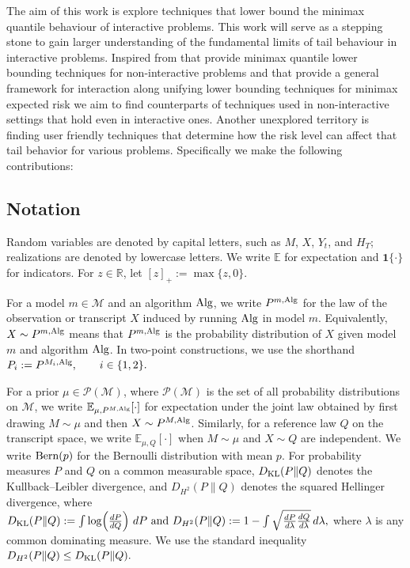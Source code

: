 \documentclass[conference]{IEEEtran}
\begin{document}
The aim of this work is explore techniques that lower bound the minimax quantile behaviour of interactive problems. This work will serve as a stepping stone to gain larger understanding of the fundamental limits of tail behaviour in interactive problems. Inspired from \cite{ma2024high} that provide minimax quantile lower bounding techniques for non-interactive problems and \cite{chen2024assouad} that provide a general framework for interaction along unifying lower bounding techniques for minimax expected risk we aim to find counterparts of techniques used in non-interactive settings that hold even in interactive ones. Another unexplored territory is finding user friendly techniques that determine how the risk level can affect that tail behavior for various problems. Specifically we make the following contributions: 


\fi

\subsection{Notation}

Random variables are denoted by capital letters, such as \(M\), \(X\), \(Y_t\), and \(H_T\); realizations are denoted by lowercase letters. We write \(\mathbb{E}\) for expectation and \(\mathbf{1}\{\cdot\}\) for indicators. For \(z\in\mathbb{R}\), let
\(
[z]_+ := \max\{z,0\}.
\)

For a model \(m\in\mathcal M\) and an algorithm \(\textup{Alg}\), we write
\(
P^{m,\textup{Alg}}
\)
for the law of the observation or transcript \(X\) induced by running \(\textup{Alg}\) in model \(m\). Equivalently,
\(
X\sim P^{m,\textup{Alg}}
\)
means that \(P^{m,\textup{Alg}}\) is the probability distribution of \(X\) given model \(m\) and algorithm \(\textup{Alg}\). In two-point constructions, we use the shorthand
\(
P_i:=P^{M_i,\textup{Alg}}, \qquad i\in\{1,2\}.
\)

For a prior \(\mu\in\mathcal{P}(\mathcal M)\), where \(\mathcal{P}(\mathcal M)\) is the set of all probability distributions on \(\mathcal M\), we write
\(
\mathbb{E}_{\mu,P^{M,\textup{Alg}}}[\cdot]
\)
for expectation under the joint law obtained by first drawing \(M\sim\mu\) and then \(X\sim P^{M,\textup{Alg}}\). Similarly, for a reference law \(Q\) on the transcript space, we write
\(
\mathbb{E}_{\mu,Q}[\cdot]
\)
when \(M\sim\mu\) and \(X\sim Q\) are independent. 
We write \(\textup{Bern}(p)\) for the Bernoulli distribution with mean \(p\). For probability measures \(P\) and \(Q\) on a common measurable space, \(D_{\textup{KL}}(P\|Q)\) denotes the Kullback--Leibler divergence, and \(D_{H^2}(P\|Q)\) denotes the squared Hellinger divergence, where
\(
D_{\textup{KL}}(P\|Q)
:=
\int \log\!\left(\frac{dP}{dQ}\right)\,dP \text{ and }
D_{H^2}(P\|Q)
:=
1-\int \sqrt{\frac{dP}{d\lambda}\frac{dQ}{d\lambda}}\,d\lambda,
\)
where \(\lambda\) is any common dominating measure. We use the standard inequality
\(
D_{H^2}(P\|Q)\le D_{\textup{KL}}(P\|Q).
\)
\end{document}
